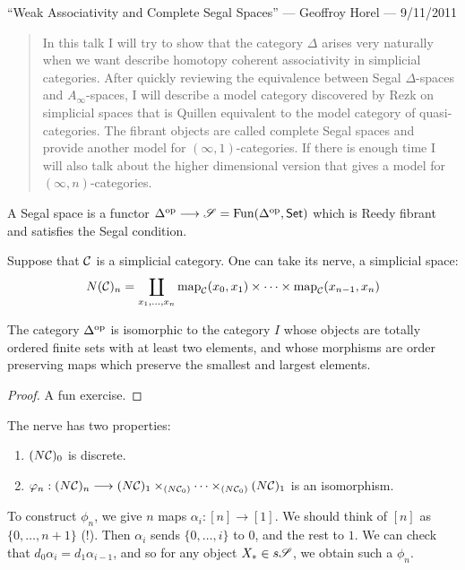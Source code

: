 \begin{GeoffroyWeakAssociativityandCompleteSegalSpaces}
\KanSemResponse
{``Weak Associativity and Complete Segal Spaces'' --- Geoffroy Horel --- 9/11/2011}
\begin{abstract}
In this talk I will try to show that the category $\Delta$ arises very 
naturally when we want describe homotopy coherent associativity in 
simplicial categories. After quickly reviewing the equivalence between 
Segal $\Delta$-spaces and $A_\infty$-spaces, I will describe a model 
category discovered by Rezk on simplicial spaces that is Quillen 
equivalent to the model category of quasi-categories. The fibrant 
objects are called complete Segal spaces and provide another model for 
$(\infty, 1)$-categories. If there is enough time I will also talk 
about the higher dimensional version that gives a model for $(\infty, 
n)$-categories.
\end{abstract}
\begin{defn*}
A Segal space is a functor $\Delta^{\textup{op}}\longrightarrow\mathscr{S}=\textup{Fun}(\Delta^{\textup{op}},\mathsf{Set})$ which is Reedy fibrant and satisfies the Segal condition.
\end{defn*}
\begin{exmp*}
Suppose that $\mathcal{C}$ is a simplicial category. One can take its nerve, a simplicial space:
\[N(\mathcal{C})_n=\coprod_{x_1,\ldots, x_n}\textup{map}_{\mathcal{C}}(x_0,x_1)\times\cdots\times\textup{map}_{\mathcal{C}}(x_{n-1},x_n)\]
\end{exmp*}
\begin{lem*}
The category $\Delta^{\textup{op}}$ is isomorphic to the category $I$ whose objects are totally ordered finite sets with at least two elements, and whose morphisms are order preserving maps which preserve the smallest and largest elements.
\end{lem*}
\begin{proof}
A fun exercise.
\end{proof}
The nerve has two properties:
\begin{enumerate}\squishlist
\item $(N\mathcal{C})_0$ is discrete.
\item $\varphi_n:(N\mathcal{C})_n\longrightarrow(N\mathcal{C})_1\times_{(N\mathcal{C}_0)}\cdots\times_{(N\mathcal{C}_0)}(N\mathcal{C})_1$ is an isomorphism.
\end{enumerate}
To construct $\phi_n$, we give $n$ maps $\alpha_i:[n]\to[1]$.  We should think of $[n]$ as $\{0,\ldots,n+1\}$ (!). Then $\alpha_i$ sends $\{0,\ldots,i\}$ to $0$, and the rest to $1$. We can check that $d_0\alpha_i=d_1\alpha_{i-1}$, and so for any object $X_*\in s\mathscr{S}$, we obtain such a $\phi_n$.


\end{GeoffroyWeakAssociativityandCompleteSegalSpaces}
